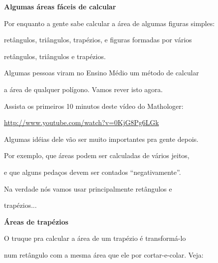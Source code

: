 \documentclass[oneside,12pt]{article}
\begin{document}
{\bf Algumas áreas fáceis de calcular}

Por enquanto a gente sabe calcular a área de algumas figuras simples:

retângulos, triângulos, trapézios, e figuras formadas por vários

retângulos, triângulos e trapézios.


\msk

Algumas pessoas viram no Ensino Médio um método de calcular

a área de qualquer polígono. Vamos rever isto agora.

Assista os primeiros 10 minutos deste vídeo do Mathologer:

\url{http://www.youtube.com/watch?v=0KjG8Pg6LGk}

\msk

Algumas idéias dele vão ser muito importantes pra gente depois.

Por exemplo, que áreas podem ser calculadas de vários jeitos,

e que alguns pedaços devem ser contados ``negativamente''.

\msk

Na verdade nós vamos usar principalmente retângulos e

trapézios...



\newpage


{\bf Áreas de trapézios}

O truque pra calcular a área de um trapézio é transformá-lo

num retângulo com a mesma área que ele por cortar-e-colar. Veja:
\end{document}
